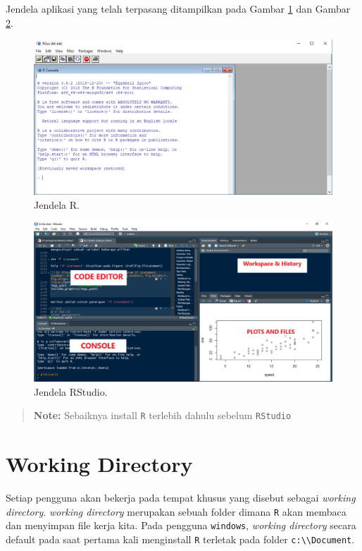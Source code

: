 \documentclass[]{book}
\begin{document}
Jendela aplikasi yang telah terpasang ditampilkan pada Gambar
\ref{fig:jendela-R} dan Gambar \ref{fig:jendela-RStudio}.

\begin{figure}

{\centering \includegraphics[width=0.8\linewidth]{jendela_r} 

}

\caption{Jendela R.}\label{fig:jendela-R}
\end{figure}

\begin{figure}

{\centering \includegraphics[width=0.8\linewidth]{jendela_rstudio} 

}

\caption{Jendela RStudio.}\label{fig:jendela-RStudio}
\end{figure}

\begin{quote}
\textbf{Note: } Sebaiknya install \texttt{R} terlebih dahulu sebelum
\texttt{RStudio}
\end{quote}

\section{Working Directory}\label{working-directory}

Setiap pengguna akan bekerja pada tempat khusus yang disebut sebagai
\emph{working directory}. \emph{working directory} merupakan sebuah
folder dimana \texttt{R} akan membaca dan menyimpan file kerja kita.
Pada pengguna \texttt{windows}, \emph{working directory} secara default
pada saat pertama kali menginstall \texttt{R} terletak pada folder
\texttt{c:\textbackslash{}\textbackslash{}Document}.
\end{document}

